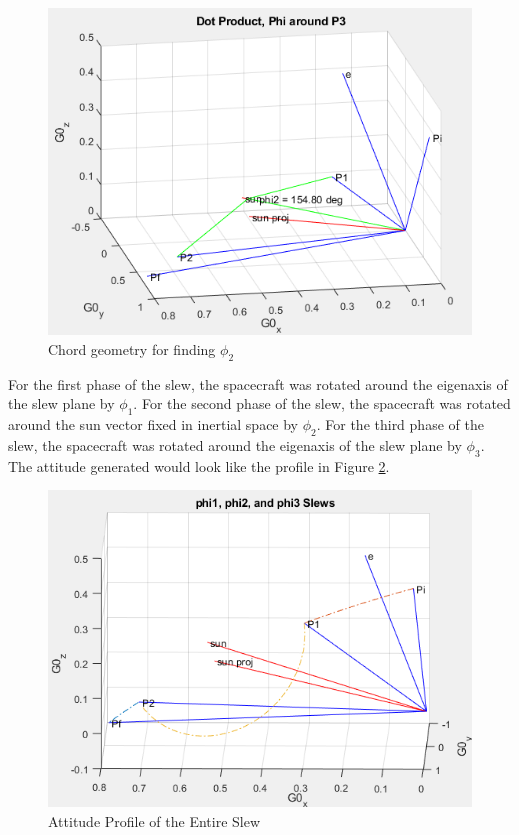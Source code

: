 \documentclass[letterpaper, preprint, paper,11pt]{AAS}	%
\begin{document}
			\begin{figure}[H]
				\label{fig:phi2_geometry}
				\includegraphics[width=6.25in]{figures/alphaNot0/chord_geometry_phi2.png}
				\caption{Chord geometry for finding $\phi_2$}
			\end{figure}
		
		For the first phase of the slew, the spacecraft was rotated around the eigenaxis of the slew plane by $\phi_1$. For the second phase of the slew, the spacecraft was rotated around the sun vector fixed in inertial space by $\phi_2$. For the third phase of the slew, the spacecraft was rotated around the eigenaxis of the slew plane by $\phi_3$. The attitude generated would look like the profile in Figure \ref{fig:phi1_phi2_phi3}. 
		
			\begin{figure}[H]
				\label{fig:phi1_phi2_phi3}
				\includegraphics[width=6.25in]{figures/alphaNot0/phi1_phi2_phi3.png}
				\caption{Attitude Profile of the Entire Slew}
			\end{figure}
		
\end{document}
